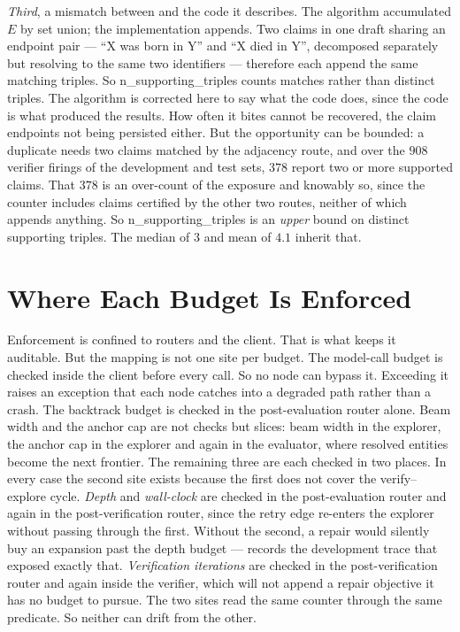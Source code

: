 \emph{Third}, a mismatch between  and the code it describes.
The algorithm accumulated $E$ by set union; the implementation appends. Two
claims in one draft sharing an endpoint pair --- ``X was born in Y'' and ``X
died in Y'', decomposed separately but resolving to the same two identifiers ---
therefore each append the same matching triples. So
\textsf{n\_supporting\_triples} counts matches rather than distinct triples. The
algorithm is corrected here to say what the code does, since the code is what
produced the results. How often it bites cannot be recovered, the claim
endpoints not being persisted either. But the opportunity can be bounded: a
duplicate needs two claims matched by the adjacency route, and over the $908$
verifier firings of the development and test sets, $378$ report two or more
supported claims. That $378$ is an over-count of the exposure and knowably so,
since the counter includes claims certified by the other two routes, neither of
which appends anything. So \textsf{n\_supporting\_triples} is an \emph{upper}
bound on distinct supporting triples. The median of $3$ and mean of $4.1$
inherit that.


\section{Where Each Budget Is Enforced}\label{app:budget-sites}

Enforcement is confined to routers and the client. That is what keeps it
auditable. But the mapping is not one site per budget. The model-call budget is
checked inside the client before every call. So no node can bypass it.
Exceeding it raises an exception that each node catches into a degraded path
rather than a crash. The backtrack budget is checked in the post-evaluation
router alone. Beam width and the anchor cap are not checks but slices: beam
width in the explorer, the anchor cap in the explorer and again in the
evaluator, where resolved entities become the next frontier. The remaining three
are each checked in two places. In every case the second site exists because
the first does not cover the verify--explore cycle. \emph{Depth} and
\emph{wall-clock} are checked in the post-evaluation router and again in the
post-verification router, since the retry edge re-enters the explorer without
passing through the first. Without the second, a repair would silently buy an
expansion past the depth budget ---  records the development
trace that exposed exactly that. \emph{Verification iterations} are checked in
the post-verification router and again inside the verifier, which will not
append a repair objective it has no budget to pursue. The two sites read the
same counter through the same predicate. So neither can drift from the other.


